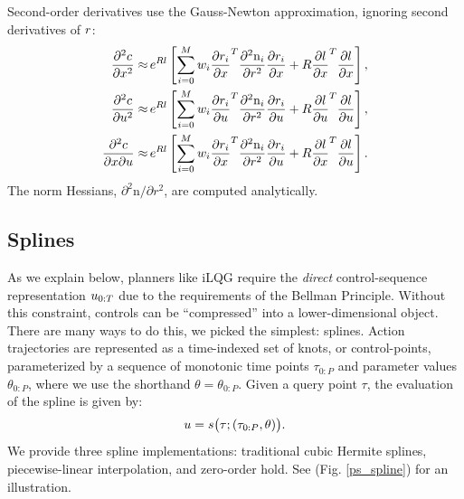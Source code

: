 Second-order derivatives use the Gauss-Newton approximation, ignoring second derivatives of ${r}$:
\begin{subequations}
	\begin{align}
		\frac{\partial^2 {c}}{\partial {x}^2} \approx&\,  e^{R {l}} \left[ \sum \limits_{i = 0}^M w_i {\frac{\partial r_i}{\partial {x}}}^T\frac{\partial^2 \text{n}_i}{\partial r^2} \frac{\partial r_i}{\partial {x}} + R {\frac{\partial {l}}{\partial {x}}}^T \frac{\partial {l}}{\partial {x}} \right], \\
		\frac{\partial^2 {c}}{\partial {u}^2} \approx& \, e^{R {l}} \left[ \sum \limits_{i = 0}^M w_i {\frac{\partial r_i}{\partial {u}}}^T\frac{\partial^2 \text{n}_i}{\partial r^2} \frac{\partial r_i}{\partial {u}}  + R {\frac{\partial {l}}{\partial {u}}}^T \frac{\partial {l}}{\partial {u}} \right],\\
		\frac{\partial^2 {c}}{\partial {x} \partial {u}} \approx& \, e^{R {l}} \left[ \sum \limits_{i = 0}^M w_i {\frac{\partial r_i}{\partial {x}}}^T \frac{\partial^2 \text{n}_i}{\partial r^2} \frac{\partial r_i}{\partial {u}} + R {\frac{\partial {l}}{\partial {x}}}^T \frac{\partial {l}}{\partial {u}} \right].
	\end{align}
\end{subequations}
The norm Hessians, $\partial^2 \text{n}/\partial r^2$, are computed analytically.

\subsection{Splines}

As we explain below, planners like iLQG require the \emph{direct} control-sequence representation ${u}_{0:T}$ due to the requirements of the Bellman Principle. Without this constraint, controls can be ``compressed'' into a lower-dimensional object. There are many ways to do this, we picked the simplest: splines. Action trajectories are represented as a time-indexed set of knots, or control-points, parameterized by a sequence of monotonic time points $\tau_{0:P}$ and parameter values $\theta_{0:P}$, where we use the shorthand $\theta = \theta_{0:P}$. Given a query point $\tau$, the evaluation of the spline is given by:
\begin{equation}
	{u} = s\big(\tau; (\tau_{0:P}, \theta) \big).
\end{equation}
We provide three spline implementations: traditional cubic Hermite splines, piecewise-linear interpolation, and zero-order hold. See (Fig. \ref{ps_spline}) for an illustration.

